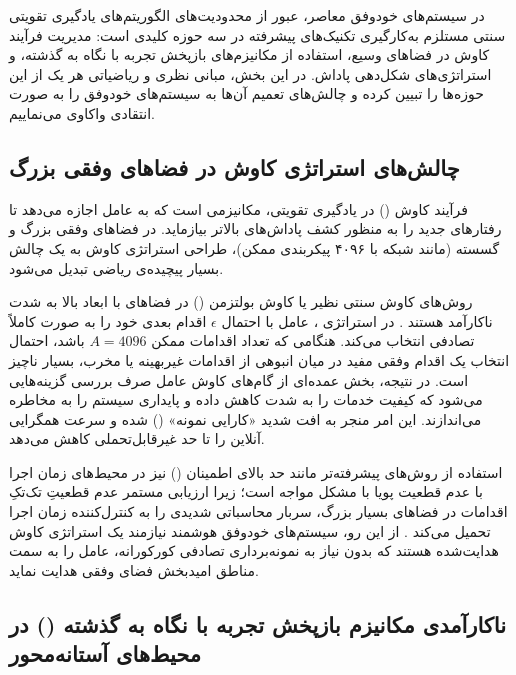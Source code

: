 \documentclass[oneside,openany,phd]{TMU-Thesis}
\begin{document}
در سیستم‌های خودوفق معاصر، عبور از محدودیت‌های الگوریتم‌های یادگیری تقویتی سنتی مستلزم به‌کارگیری تکنیک‌های پیشرفته در سه حوزه کلیدی است: مدیریت فرآیند کاوش در فضاهای وسیع، استفاده از مکانیزم‌های بازپخش تجربه با نگاه به گذشته، و استراتژی‌های شکل‌دهی پاداش. در این بخش، مبانی نظری و ریاضیاتی هر یک از این حوزه‌ها را تبیین کرده و چالش‌های تعمیم آن‌ها به سیستم‌های خودوفق را به صورت انتقادی واکاوی می‌نماییم.

\subsection{چالش‌های استراتژی کاوش در فضاهای وفقی بزرگ}
\label{sec:ch3_exploration_challenges}

فرآیند کاوش () در یادگیری تقویتی، مکانیزمی است که به عامل اجازه می‌دهد تا رفتارهای جدید را به منظور کشف پاداش‌های بالاتر بیازماید. در فضاهای وفقی بزرگ و گسسته (مانند شبکه  با ۴۰۹۶ پیکربندی ممکن)، طراحی استراتژی کاوش به یک چالش بسیار پیچیده‌ی ریاضی تبدیل می‌شود.

روش‌های کاوش سنتی نظیر  یا کاوش بولتزمن () در فضاهای با ابعاد بالا به شدت ناکارآمد هستند \cite{du2023scalability, du2023alleviating}. در استراتژی ، عامل با احتمال $\epsilon$ اقدام بعدی خود را به صورت کاملاً تصادفی انتخاب می‌کند. هنگامی که تعداد اقدامات ممکن $A = 4096$ باشد، احتمال انتخاب یک اقدام وفقی مفید در میان انبوهی از اقدامات غیربهینه یا مخرب، بسیار ناچیز است. در نتیجه، بخش عمده‌ای از گام‌های کاوش عامل صرف بررسی گزینه‌هایی می‌شود که کیفیت خدمات را به شدت کاهش داده و پایداری سیستم را به مخاطره می‌اندازند. این امر منجر به افت شدید «کارایی نمونه» () شده و سرعت همگرایی آنلاین را تا حد غیرقابل‌تحملی کاهش می‌دهد.

استفاده از روش‌های پیشرفته‌تر مانند حد بالای اطمینان () نیز در محیط‌های زمان اجرا با عدم قطعیت پویا با مشکل مواجه است؛ زیرا ارزیابی مستمر عدم قطعیتِ تک‌تکِ اقدامات در فضاهای بسیار بزرگ، سربار محاسباتی شدیدی را به کنترل‌کننده زمان اجرا تحمیل می‌کند \cite{sutton2018reinforcement}. از این رو، سیستم‌های خودوفق هوشمند نیازمند یک استراتژی کاوش هدایت‌شده هستند که بدون نیاز به نمونه‌برداری تصادفی کورکورانه، عامل را به سمت مناطق امیدبخش فضای وفقی هدایت نماید.

\subsection{ناکارآمدی مکانیزم بازپخش تجربه با نگاه به گذشته () در محیط‌های آستانه‌محور}
\label{sec:ch3_her_inefficiency}
\end{document}
